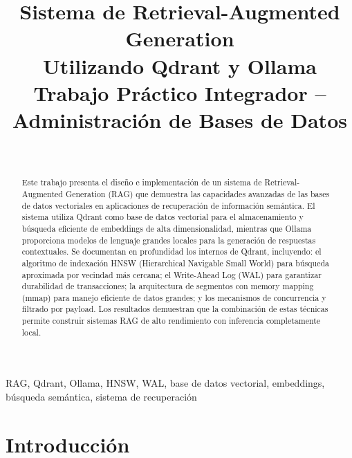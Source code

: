 \documentclass[conference]{IEEEtran}
\begin{document}
\title{Sistema de Retrieval-Augmented Generation\\Utilizando Qdrant y Ollama\\[2mm]
{\large Trabajo Práctico Integrador -- Administración de Bases de Datos}}

\author{
    \\[2mm]
}

\begin{abstract}
Este trabajo presenta el diseño e implementación de un sistema de Retrieval-Augmented Generation (RAG) que demuestra las capacidades avanzadas de las bases de datos vectoriales en aplicaciones de recuperación de información semántica. El sistema utiliza Qdrant como base de datos vectorial para el almacenamiento y búsqueda eficiente de embeddings de alta dimensionalidad, mientras que Ollama proporciona modelos de lenguaje grandes locales para la generación de respuestas contextuales. Se documentan en profundidad los internos de Qdrant, incluyendo: el algoritmo de indexación HNSW (Hierarchical Navigable Small World) para búsqueda aproximada por vecindad más cercana; el Write-Ahead Log (WAL) para garantizar durabilidad de transacciones; la arquitectura de segmentos con memory mapping (mmap) para manejo eficiente de datos grandes; y los mecanismos de concurrencia y filtrado por payload. Los resultados demuestran que la combinación de estas técnicas permite construir sistemas RAG de alto rendimiento con inferencia completamente local.
\end{abstract}

\begin{IEEEkeywords}
RAG, Qdrant, Ollama, HNSW, WAL, base de datos vectorial, embeddings, búsqueda semántica, sistema de recuperación
\end{IEEEkeywords}

\maketitle

\section{Introducción}
\label{sec:introduccion}
\end{document}
